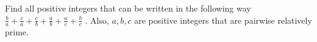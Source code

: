 Find all positive integers that can be written in the following way $\frac{b}{a}+\frac{c}{a}+\frac{c}{b}+\frac{a}{b}+\frac{a}{c}+\frac{b}{c}$ .
Also, $a,b, c$ are positive integers that are pairwise relatively prime.